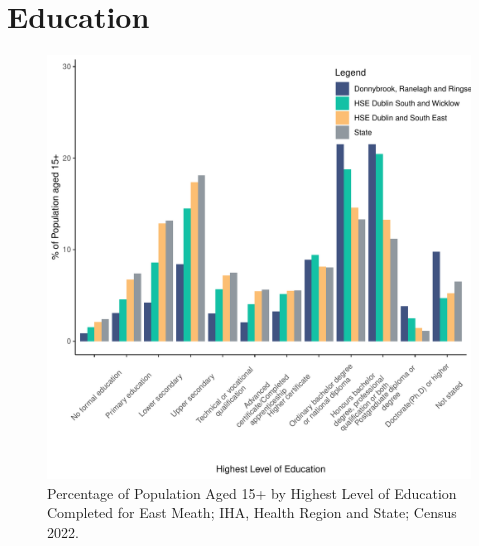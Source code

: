 \documentclass{article}
\begin{document}
\section{Education}\label{sect:Edu}
\begin{figure}[H]
	\centering
	\includegraphics[width = 120mm]{../figures/EduED.pdf}
	\caption{Percentage of Population Aged 15+ by Highest Level of Education Completed for East Meath; IHA, Health Region and State; Census 2022.}
	\label{fig:vbnv}
	\end{figure}
\end{document}
